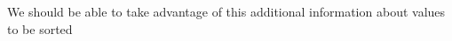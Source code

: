 \documentclass[preview]{standalone}
\begin{document}
\begin{center}
We should be able to take advantage of this additional information about values to be sorted
\end{center}
\end{document}
